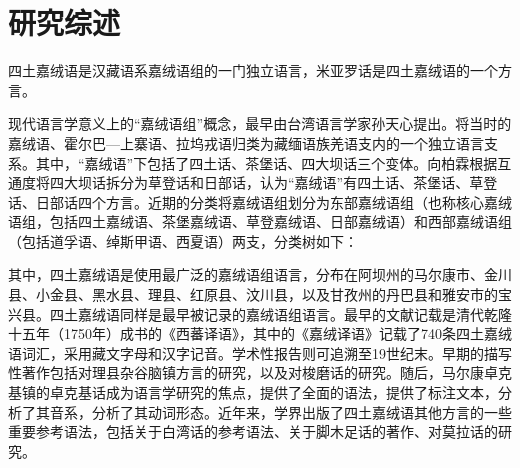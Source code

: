 \section{研究综述}

四土嘉绒语是汉藏语系嘉绒语组的一门独立语言，米亚罗话是四土嘉绒语的一个方言。

现代语言学意义上的“嘉绒语组”概念，最早由台湾语言学家孙天心提出。\textcite{sun2000parallelisms,sun2000stem}将当时的嘉绒语、霍尔巴—上寨语、拉坞戎语归类为藏缅语族羌语支内的一个独立语言支系。其中，“嘉绒语”下包括了四土话、茶堡话、四大坝话三个变体。向柏霖根据互通度将四大坝话拆分为草登话和日部话，认为“嘉绒语”有四土话、茶堡话、草登话、日部话四个方言\cite{Xiang2008,jacques2004phonologie}。近期的分类将嘉绒语组划分为东部嘉绒语组（也称核心嘉绒语组，包括四土嘉绒语、茶堡嘉绒语、草登嘉绒语、日部嘉绒语）和西部嘉绒语组（包括道孚语、绰斯甲语、西夏语）两支\cite{lai2020tangut}，分类树如下：

\begin{center}
\end{center}

其中，四土嘉绒语是使用最广泛的嘉绒语组语言，分布在阿坝州的马尔康市、金川县、小金县、黑水县、理县、红原县、汶川县，以及甘孜州的丹巴县和雅安市的宝兴县\cite[411]{Lin-1993-cd}。四土嘉绒语同样是最早被记录的嘉绒语组语言。最早的文献记载是清代乾隆十五年（1750年）成书的《西蕃译语》，其中的《嘉绒译语》记载了740条四土嘉绒语词汇，采用藏文字母和汉字记音\cite{Gong2018-aw,Nie2010}。学术性报告则可追溯至19世纪末\cite{Von_Rosthorn1897-du}。早期的描写性著作包括\textcite{Jin1949-uh}对理县杂谷脑镇方言的研究，以及\textcite{Jin-1957-oe}对梭磨话的研究。随后，马尔康卓克基镇的卓克基话成为语言学研究的焦点，\textcite{Lin-1993-cd}提供了全面的语法，\textcite{Lin-2016-dr}提供了标注文本，\textcite{hsieh1999theoretical,lin2012no}分析了其音系，\textcite{Lin2000-jd,Nagano1984-tn,Wei2001-mw}分析了其动词形态。近年来，学界出版了四土嘉绒语其他方言的一些重要参考语法，包括\textcite{zhang2016phonologie,Zhang2020-ya}关于白湾话的参考语法、\textcite{prins2011web}关于脚木足话的著作、\textcite{Chang-Ye-2018-gb}对莫拉话的研究。

